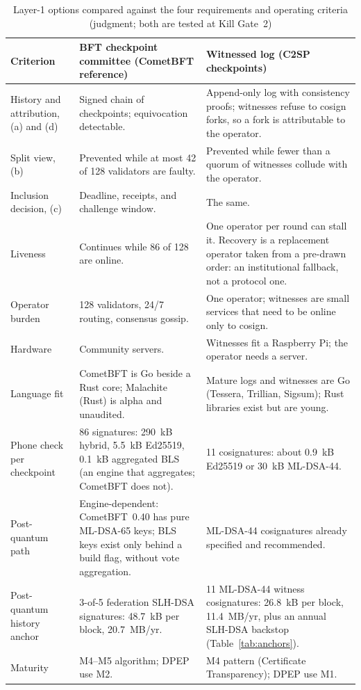 \documentclass[10pt,twoside,openany]{book}
\theoremstyle{dpepstyle}
\begin{document}
\begin{table}[htbp]
\centering
\caption{Layer-1 options compared against the four requirements and operating criteria (judgment; both are tested at Kill Gate~2)}
\label{tab:layer1-options}
\scriptsize
\setlength{\tabcolsep}{3pt}
\begin{tabularx}{\textwidth}{L{0.95in} Y Y}
\toprule
\textbf{Criterion} & \textbf{BFT checkpoint committee (CometBFT reference)} & \textbf{Witnessed log (C2SP checkpoints)} \\
\midrule
History and attribution, (a) and (d) & Signed chain of checkpoints; equivocation detectable. & Append-only log with consistency proofs; witnesses refuse to cosign forks, so a fork is attributable to the operator. \\
Split view, (b) & Prevented while at most 42 of 128 validators are faulty. & Prevented while fewer than a quorum of witnesses collude with the operator. \\
Inclusion decision, (c) & Deadline, receipts, and challenge window. & The same. \\
Liveness & Continues while 86 of 128 are online. & One operator per round can stall it. Recovery is a replacement operator taken from a pre-drawn order: an institutional fallback, not a protocol one. \\
Operator burden & 128 validators, 24/7 routing, consensus gossip. & One operator; witnesses are small services that need to be online only to cosign. \\
Hardware & Community servers. & Witnesses fit a Raspberry Pi; the operator needs a server. \\
Language fit & CometBFT is Go beside a Rust core; Malachite (Rust) is alpha and unaudited. & Mature logs and witnesses are Go (Tessera, Trillian, Sigsum); Rust libraries exist but are young. \\
Phone check per checkpoint & 86 signatures: 290~kB hybrid, 5.5~kB Ed25519, 0.1~kB aggregated BLS (an engine that aggregates; CometBFT does not). & 11 cosignatures: about 0.9~kB Ed25519 or 30~kB ML-DSA-44. \\
Post-quantum path & Engine-dependent: CometBFT~0.40 has pure ML-DSA-65 keys; BLS keys exist only behind a build flag, without vote aggregation. & ML-DSA-44 cosignatures already specified and recommended. \\
Post-quantum history anchor & 3-of-5 federation SLH-DSA signatures: 48.7~kB per block, 20.7~MB/yr. & 11 ML-DSA-44 witness cosignatures: 26.8~kB per block, 11.4~MB/yr, plus an annual SLH-DSA backstop (Table~\ref{tab:anchors}). \\
Maturity & M4--M5 algorithm; DPEP use M2. & M4 pattern (Certificate Transparency); DPEP use M1. \\
\bottomrule
\end{tabularx}
\end{table}
\end{document}
